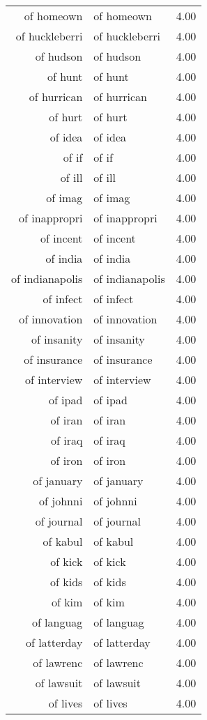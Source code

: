 \begin{table}[ht]
\begin{tabular}{rlr}
  of homeown & of homeown & 4.00 \\ 
  of huckleberri & of huckleberri & 4.00 \\ 
  of hudson & of hudson & 4.00 \\ 
  of hunt & of hunt & 4.00 \\ 
  of hurrican & of hurrican & 4.00 \\ 
  of hurt & of hurt & 4.00 \\ 
  of idea & of idea & 4.00 \\ 
  of if & of if & 4.00 \\ 
  of ill & of ill & 4.00 \\ 
  of imag & of imag & 4.00 \\ 
  of inappropri & of inappropri & 4.00 \\ 
  of incent & of incent & 4.00 \\ 
  of india & of india & 4.00 \\ 
  of indianapolis & of indianapolis & 4.00 \\ 
  of infect & of infect & 4.00 \\ 
  of innovation & of innovation & 4.00 \\ 
  of insanity & of insanity & 4.00 \\ 
  of insurance & of insurance & 4.00 \\ 
  of interview & of interview & 4.00 \\ 
  of ipad & of ipad & 4.00 \\ 
  of iran & of iran & 4.00 \\ 
  of iraq & of iraq & 4.00 \\ 
  of iron & of iron & 4.00 \\ 
  of january & of january & 4.00 \\ 
  of johnni & of johnni & 4.00 \\ 
  of journal & of journal & 4.00 \\ 
  of kabul & of kabul & 4.00 \\ 
  of kick & of kick & 4.00 \\ 
  of kids & of kids & 4.00 \\ 
  of kim & of kim & 4.00 \\ 
  of languag & of languag & 4.00 \\ 
  of latterday & of latterday & 4.00 \\ 
  of lawrenc & of lawrenc & 4.00 \\ 
  of lawsuit & of lawsuit & 4.00 \\ 
  of lives & of lives & 4.00 \\ 

\end{tabular}
\end{table}
